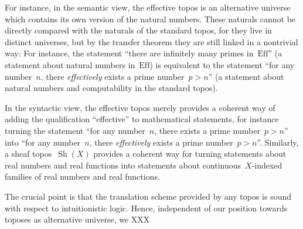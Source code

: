 \documentclass[oneside,reqno]{amsart}
\theoremstyle{definition}
\theoremstyle{plain}
\theoremstyle{remark}
\DeclareMathOperator{\Sh}{Sh}
\newcommand{\Eff}{\mathrm{Ef{}f}}
\renewcommand{\_}{\mathpunct{.}\,}
\newcommand{\effective}{ef{}fective\xspace}
\newcommand{\effectively}{ef{}fectively\xspace}
\newcommand{\?}{\,{:}\,}
\begin{document}
For instance, in the semantic view, the \effective topos is an alternative
universe which contains its own version of the natural numbers. These naturals
cannot be directly compared with the naturals of the standard topos, for they
live in distinct universes, but by the transfer theorem they are still linked in a
nontrivial way: For instance, the statement ``there are infinitely many primes
in~$\Eff$'' (a statement about natural numbers in~$\Eff$) is equivalent to the statement
``for any number~$n$, there \emph{\effectively} exists a prime number~$p > n$''
(a statement about natural numbers and computability in the standard topos).

In the syntactic view, the \effective topos merely provides a coherent way of
adding the qualification ``\effective'' to mathematical statements, for
instance turning the statement ``for any number~$n$, there exists a prime number~$p
> n$'' into ``for any number~$n$, there \emph{\effectively} exists a prime
number~$p > n$''. Similarly, a sheaf topos~$\Sh(X)$ provides a coherent way for
turning statements about real numbers and real functions into statements about
continuous~$X$-indexed families of real numbers and real functions.

The crucial point is that the translation scheme provided by any topos is sound
with respect to intuitionistic logic. Hence, independent of our position
towards toposes as alternative universe, we XXX

\printbibliography
\end{document}
